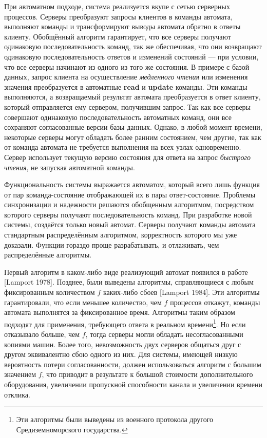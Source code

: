 \documentclass[12pt, a4paper]{article} %
\begin{document}
При автоматном подходе, система реализуется вкупе с сетью серверных процессов. Серверы преобразуют запросы клиентов в команды автомата, выполняют команды и трансформируют выводы автомата обратно в ответы клиенту. Обобщённый алгоритм гарантирует, что все серверы получают одинаковую последовательность команд, так же обеспечивая, что они возвращают одинаковую последовательность ответов и изменений состояний --- при условии, что все серверы начинают из одного из того же состояния. В примере с базой данных, запрос клиента на осуществление \textit{медленного чтения} или изменения значения преобразуется в автоматные \textbf{read} и \textbf{update} команды. Эти команды выполняются, а возвращаемый результат автомата преобразуется в ответ клиенту, который отправляется ему сервером, получившим запрос. Так как все серверы совершают одинаковую последовательность автоматных команд, они все сохраняют согласованные версии базы данных. Однако, в любой момент времени, некоторые серверы могут обладать более ранним состоянием, чем другие, так как от команда автомата не требуется выполнения на всех узлах одновременно. Сервер использует текущую версию состояния для ответа на запрос \textit{быстрого чтения}, не запуская автоматной команды.

Функциональность системы выражается автоматом, который всего лишь функция от пар команда-состояние отображающей их в пары ответ-состояние. Проблемы синхронизации и надежности решаются обобщенным алгоритмом, посредством которого серверы получают последовательность команд. При разработке новой системы, создаётся только новый автомат. Серверы получают команды автомата стандартным распределённым алгоритмом, корректность которого мы уже доказали. Функции гораздо проще разрабатывать, и отлаживать, чем распределённые алгоритмы.

Первый алгоритм в каком-либо виде реализующий автомат появился в работе [Lamport 1978]. Позднее, были выведены алгоритмы, справляющиеся с любым фиксированным количеством $f$ каких-либо сбоев [Lamport 1984]. Эти алгоритмы гарантировали, что если меньшее количество, чем $f$ процессов откажут, команды автомата выполнятся за фиксированное время. Алгоритмы таким образом подходят для применения, требующего ответа в реальном времени\footnote{Эти алгоритмы были выведены из военного протокола другого Средиземноморского государства.}. Но если отказывало больше, чем $f$, тогда серверы могли обладать несогласованными копиями машин. Более того, невозможность двух серверов общаться друг с другом эквивалентно сбою одного из них. Для системы, имеющей низкую вероятность потери согласованности, должен использоваться алгоритм с большим значением $f$, что приводит в результате к большой стоимости дополнительного оборудования, увеличении пропускной способности канала и увеличении времени отклика.
\end{document}
